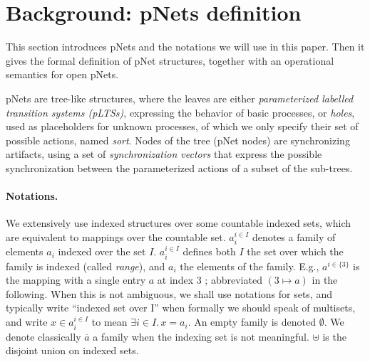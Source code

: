 \documentclass{lncs/llncs}
\newcommand{\TODO}[1]{\textcolor{red}{\textbf{[TODO:#1]}}}
\begin{document}
\section{Background: pNets definition}
\label{section:pnets}

  
This section introduces pNets and the notations we will use in
this paper. Then it gives the formal definition of pNet structures,
together with an operational semantics for open pNets.

pNets are tree-like structures, where the leaves are either
\emph{parameterized labelled transition systems (pLTSs)}, expressing the
behavior of basic processes, or \emph{holes}, used as placeholders
for unknown processes, of which we only specify their set of possible
actions, named \emph{sort}.
Nodes of the tree (pNet nodes) are synchronizing artifacts, using a
set of \emph{synchronization vectors} that express the possible
synchronization between the parameterized actions of a subset of the
sub-trees.


\paragraph*{Notations.}
We extensively use indexed structures
over some countable indexed sets, which are equivalent to mappings over
the countable set. %
$a_i^{i\in I}$
denotes a family of elements $a_i$ indexed over the
set $I$. %
$a_i^{i\in I}$ defines both $I$ the set over which the family is
indexed (called \emph{range}), and $a_i$ the elements of the family.
E.g., $a^{i\in\{3\}}$ is the mapping with a single entry $a$ at index
$3$ ; abbreviated $(3\mapsto a)$ in the following.
When this is not
ambiguous, we shall use notations for sets, and typically write
``indexed set over I'' when formally we should speak of multisets, and
write $x\in a_i^{i\in I}$ to mean $\exists i\in I.\, x=a_i$.  An empty
family is denoted $\emptyset$. We
denote classically $\overline{a}$ a family when the indexing set is
not meaningful.  $\uplus$ is the disjoint union on
indexed sets.
\end{document}
